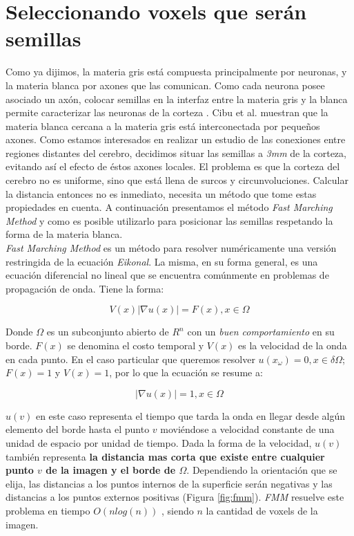 \section{Seleccionando voxels que ser\'an semillas}

Como ya dijimos, la materia gris est\'a compuesta principalmente por neuronas,
y la materia blanca por axones que las comunican. Como cada neurona
posee asociado un ax\'on, colocar semillas en la interfaz entre la materia gris
y la blanca permite caracterizar las neuronas de la corteza \cite{Mori2002}
\cite{Anwander2006}. Cibu et al. \cite{Thomas2014} muestran que la materia blanca
cercana a la materia gris est\'a interconectada por peque\~nos axones. Como
estamos interesados en realizar un estudio de las conexiones entre regiones
distantes del cerebro, decidimos situar las semillas a \textit{3mm} de la corteza,
evitando as\'i el efecto de \'estos axones locales. El problema es que la corteza
del cerebro no es uniforme, sino que est\'a llena de surcos y circunvoluciones. 
Calcular la distancia entonces no es inmediato, necesita un m\'etodo que tome
estas propiedades en cuenta. A continuaci\'on presentamos el m\'etodo
\textit{Fast Marching Method} y como es posible utilizarlo para posicionar las
semillas respetando la forma de la materia blanca. \\

\textit{Fast Marching Method} es un m\'etodo para resolver num\'ericamente una
versi\'on restringida de la ecuaci\'on \textit{Eikonal}. La misma, en su forma
general, es una ecuaci\'on diferencial no lineal que se encuentra com\'unmente 
en problemas de propagaci\'on de onda. Tiene la forma: 

$$ V(x) | \nabla u(x) | = F(x) , x \in \Omega $$ 

Donde $\Omega$ es un subconjunto abierto de $R^n$ con un
\textit{buen comportamiento} en su borde. $F(x)$ se denomina el costo temporal y
$V(x)$ es la velocidad de la onda en cada punto. En el caso particular que
queremos resolver $u(x_\omega) = 0, x \in \delta\Omega$;  $F(x)=1$ y $V(x)=1$,
por lo que la ecuaci\'on se resume a:

$$ | \nabla u(x) | = 1 , x \in \Omega $$ 

$u(v)$ en este caso representa el tiempo que tarda la onda en llegar desde
alg\'un elemento del borde hasta el punto $v$ movi\'endose a velocidad constante
de una unidad de espacio por unidad de tiempo. Dada la forma de la velocidad, 
$u(v)$ tambi\'en representa \textbf{la distancia mas corta que existe entre cualquier
punto $v$ de la imagen y el borde de $\Omega$}. Dependiendo la orientaci\'on que 
se elija, las distancias a los puntos internos de la superficie ser\'an negativas
y las distancias a los puntos externos positivas (Figura \ref{fig:fmm}). 
\textit{FMM} resuelve este problema en tiempo $O(n log(n))$ \cite{Sethian2001},
siendo $n$ la cantidad de voxels de la imagen.\\

